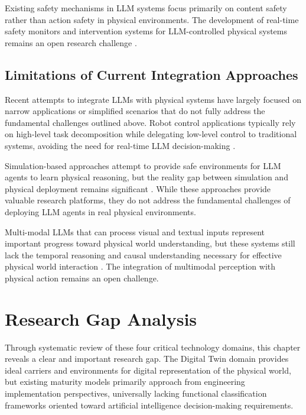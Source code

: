 Existing safety mechanisms in LLM systems focus primarily on content safety rather than action safety in physical environments. The development of real-time safety monitors and intervention systems for LLM-controlled physical systems remains an open research challenge \cite{pecka2014safe}.

\subsection{Limitations of Current Integration Approaches}

Recent attempts to integrate LLMs with physical systems have largely focused on narrow applications or simplified scenarios that do not fully address the fundamental challenges outlined above. Robot control applications typically rely on high-level task decomposition while delegating low-level control to traditional systems, avoiding the need for real-time LLM decision-making \cite{ahn2022saycan}.

Simulation-based approaches attempt to provide safe environments for LLM agents to learn physical reasoning, but the reality gap between simulation and physical deployment remains significant \cite{tobin2017domain}. While these approaches provide valuable research platforms, they do not address the fundamental challenges of deploying LLM agents in real physical environments.

Multi-modal LLMs that can process visual and textual inputs represent important progress toward physical world understanding, but these systems still lack the temporal reasoning and causal understanding necessary for effective physical world interaction \cite{alayrac2022flamingo}. The integration of multimodal perception with physical action remains an open challenge.

\section{Research Gap Analysis}

Through systematic review of these four critical technology domains, this chapter reveals a clear and important research gap. The Digital Twin domain provides ideal carriers and environments for digital representation of the physical world, but existing maturity models primarily approach from engineering implementation perspectives, universally lacking functional classification frameworks oriented toward artificial intelligence decision-making requirements.

